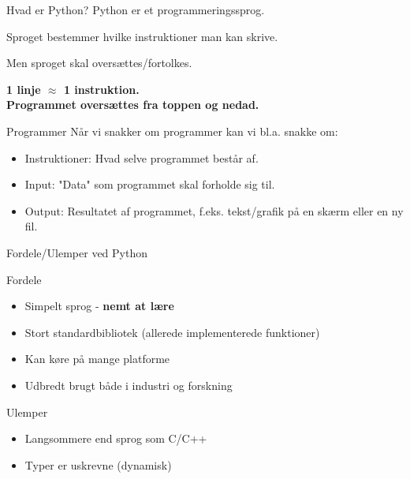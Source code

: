 \documentclass{beamer}
\begin{document}
\begin{frame}{Hvad er Python?}
Python er et programmeringssprog.

Sproget bestemmer hvilke instruktioner man kan skrive.

Men sproget skal oversættes/fortolkes.

\pause
\begin{center}
\textbf{1 linje $\approx$ 1 instruktion. \\
	Programmet oversættes fra toppen og nedad.}
\end{center}
\end{frame}



\begin{frame}{Programmer}
Når vi snakker om programmer kan vi bl.a. snakke om:
\begin{itemize}
	\item Instruktioner: Hvad selve programmet består af.
	\pause
	\item Input: "Data" som programmet skal forholde sig til.
	\pause
	\item Output: Resultatet af programmet, f.eks. tekst/grafik på en skærm eller en ny fil.
\end{itemize}

\end{frame}



\begin{frame}{Fordele/Ulemper ved Python}
\begin{exampleblock}{Fordele}
\begin{itemize}
\item Simpelt sprog - \textbf{nemt at lære}
\item Stort standardbibliotek (allerede implementerede funktioner)
\item Kan køre på mange platforme
\item Udbredt brugt både i industri og forskning
\end{itemize}
\end{exampleblock}

\begin{alertblock}{Ulemper}
\begin{itemize}
\item Langsommere end sprog som C/C++
\item Typer er uskrevne (dynamisk)
\end{itemize}
\end{alertblock}
\end{frame}
\end{document}
